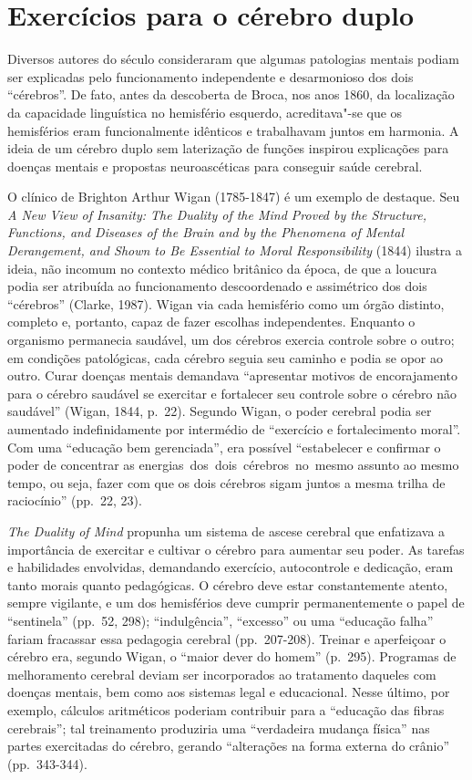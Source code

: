 \section{Exercícios para o cérebro duplo}

Diversos autores do século  consideraram que algumas patologias
mentais podiam ser explicadas pelo funcionamento independente e
desarmonioso dos dois ``cérebros''. De fato, antes da descoberta de
Broca, nos anos 1860, da localização da capacidade linguística no
hemisfério esquerdo, acreditava"-se que os hemisférios eram
funcionalmente idênticos e trabalhavam juntos em harmonia. A ideia de um
cérebro duplo sem laterização de funções inspirou explicações para
doenças mentais e propostas neuroascéticas para conseguir saúde
cerebral.

O clínico de Brighton Arthur Wigan (1785-1847) é um exemplo de destaque.
Seu \emph{A New View of Insanity: The Duality of the Mind Proved by the
Structure, Functions, and Diseases of the Brain and by the Phenomena of
Mental Derangement, and Shown to Be Essential to Moral Responsibility}
(1844) ilustra a ideia, não incomum no contexto médico britânico da
época, de que a loucura podia ser atribuída ao funcionamento
descoordenado e assimétrico dos dois ``cérebros'' (Clarke, 1987). Wigan
via cada hemisfério como um órgão distinto, completo e, portanto, capaz
de fazer escolhas independentes. Enquanto o organismo permanecia
saudável, um dos cérebros exercia controle sobre o outro; em condições
patológicas, cada cérebro seguia seu caminho e podia se opor ao outro.
Curar doenças mentais demandava ``apresentar motivos de encorajamento
para o cérebro saudável se exercitar e fortalecer seu controle sobre o
cérebro não saudável'' (Wigan, 1844, p.~22). Segundo Wigan, o poder
cerebral podia ser aumentado indefinidamente por intermédio de
``exercício e fortalecimento moral''. Com uma ``educação bem
gerenciada'', era possível ``estabelecer e confirmar o poder de
concentrar as energias~dos~dois~cérebros~no~mesmo assunto ao mesmo
tempo, ou seja, fazer com que os dois cérebros sigam juntos a mesma
trilha de raciocínio'' (pp.~22, 23).

\emph{The Duality of Mind} propunha um sistema de ascese cerebral que
enfatizava a importância de exercitar e cultivar o cérebro para aumentar
seu poder. As tarefas e habilidades envolvidas, demandando exercício,
autocontrole e dedicação, eram tanto morais quanto pedagógicas. O
cérebro deve estar constantemente atento, sempre vigilante, e um dos
hemisférios deve cumprir permanentemente o papel de ``sentinela'' (pp.~52,
298); ``indulgência'', ``excesso'' ou uma ``educação falha'' fariam
fracassar essa pedagogia cerebral (pp.~207-208). Treinar e aperfeiçoar o
cérebro era, segundo Wigan, o ``maior dever do homem'' (p.~295).
Programas de melhoramento cerebral deviam ser incorporados ao tratamento
daqueles com doenças mentais, bem como aos sistemas legal e educacional.
Nesse último, por exemplo, cálculos aritméticos poderiam contribuir para
a ``educação das fibras cerebrais''; tal treinamento produziria uma
``verdadeira mudança física'' nas partes exercitadas do cérebro, gerando
``alterações na forma externa do crânio'' (pp.~343-344).

